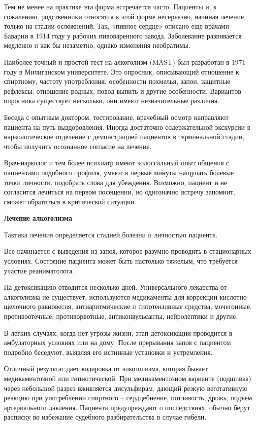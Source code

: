 Тем не менее на практике эта форма встречается часто. Пациенты и, к сожалению, родственники относятся к этой форме несерьезно, начиная лечение только на стадии осложнений. Так, «пивное сердце» описано еще врачами Баварии в 1914 году у рабочих пивоваренного завода. Заболевание развивается медленно и как бы незаметно, однако изменения необратимы.

Наиболее точный и простой тест на алкоголизм (MAST) был разработан в 1971 году в Мичиганском университете. Это опросник, описывающий отношение к спиртному, частоту употребления, особенности похмелья, запои, защитные рефлексы, отношение родных, повод выпить и другие особенности. Вариантов опросника существует несколько, они имеют незначительные различия.

Беседа с опытным доктором, тестирование, врачебный осмотр направляют пациента на путь выздоровления. Иногда достаточно содержательной экскурсии в наркологическое отделение с демонстрацией пациентов в терминальной стадии, чтобы получить осознанное согласие на лечение.

Врач-нарколог и тем более психиатр имеют колоссальный опыт общения с пациентами подобного профиля, умеют в первые минуты нащупать болевые точки личности, подобрать слова для убеждения. Возможно, пациент и не согласится лечиться на первом посещении, но однозначно встречу запомнит, сможет обратиться в критической ситуации.

\textbf{Лечение алкоголизма}

Тактика лечения определяется стадией болезни и личностью пациента.

Все начинается с выведения из запоя, которое разумно проводить в стационарных условиях. Состояние пациента может быть настолько тяжелым, что требуется участие реаниматолога.

На детоксикацию отводится несколько дней. Универсального лекарства от алкоголизма не существует, используются медикаменты для коррекции кислотно-щелочного равновесия, антиаритмические и гипотензивные средства, мочегонные, противоотечные, противорвотные, антиконвульсанты, нейролептики и другие.

В легких случаях, когда нет угрозы жизни, этап детоксикации проводится в амбулаторных условиях или на дому. После прерывания запоя с пациентом подробно беседуют, выявляя его истинные установки и устремления.

Отличный результат дает кодировка от алкоголизма, которая бывает медикаментозной или гипнотической. При медикаментозном варианте (подшивка) через небольшой разрез вживляется дисульфирам, дающий резкую вегетативную реакцию при употреблении спиртного – сердцебиение, потливость, дрожь, подъем артериального давления. Пациента предупреждают о последствиях, обычно берут расписку во избежание судебного разбирательства в случае гибели.

